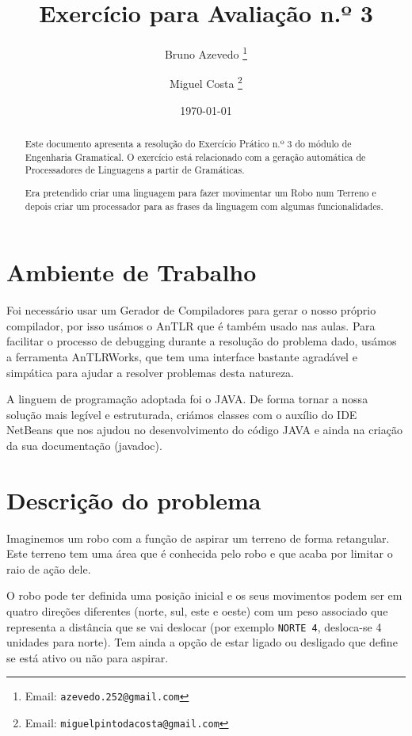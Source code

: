 \documentclass[a4paper]{article}
\title{Exercí­cio para Avaliação n.º 3}
\author{Bruno Azevedo%
\thanks{Email: \texttt{azevedo.252@gmail.com}}}
\author{Miguel Costa%
\thanks{Email: \texttt{miguelpintodacosta@gmail.com}}}
\affil{Módulo Engenharia Gramatical,\\ UCE30 Engenharia de Linguagens,
\\ Mestrado em Engenharia Informatica,\\Universidade do Minho}
\date{\today}
\begin{document}
 
 
\maketitle
 
\begin{abstract}
Este documento apresenta a resolução do Exercício Prático n.º 3 do módulo de Engenharia Gramatical.
O exercício está relacionado com a geração automática de Processadores de Linguagens a partir de Gramáticas.
 
Era pretendido criar uma linguagem para fazer movimentar um Robo num Terreno e depois criar um processador para as frases da linguagem com algumas funcionalidades.
\end{abstract}
 
 
\newpage
 
\parskip=0mm
\tableofcontents
\parskip=2mm
 
\newpage
 
\section{Ambiente de Trabalho}
Foi necessário usar um Gerador de Compiladores para gerar o nosso próprio compilador, por isso usámos o AnTLR que é também usado nas aulas. Para facilitar o processo de debugging durante a resolução do problema dado, usámos a ferramenta AnTLRWorks, que tem uma interface bastante agradável e simpática para ajudar a resolver problemas desta natureza.
 
A linguem de programação adoptada foi o JAVA. De forma tornar a nossa solução mais legível e estruturada, criámos classes com o auxílio do IDE NetBeans que nos ajudou no desenvolvimento do código JAVA e ainda na criação da sua documentação (javadoc).
 
 
\section{Descrição do problema}
Imaginemos um robo com a função de aspirar um terreno de forma retangular. Este terreno tem uma área que é conhecida pelo robo e que acaba por limitar o raio de ação dele.
 
O robo pode ter definida uma posição inicial e os seus movimentos podem ser em quatro direções diferentes (norte, sul, este e oeste) com um peso associado que representa a distância que se vai deslocar (por exemplo \verb|NORTE 4|, desloca-se 4 unidades para norte). Tem ainda a opção de estar ligado ou desligado que define se está ativo ou não para aspirar.
 
\end{document}
